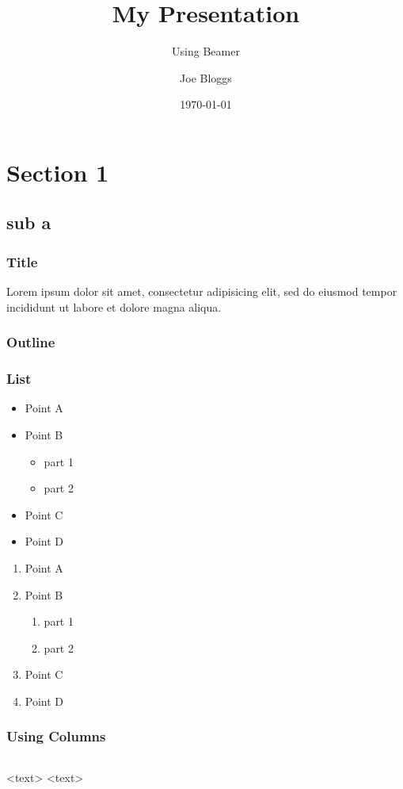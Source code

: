 \documentclass{beamer}
\title{My Presentation}
\subtitle{Using Beamer}
\author{Joe Bloggs}
\institute{University of ShareLaTeX}
\date{\today}
\begin{document}
\begin{frame}
  \titlepage
\end{frame}
\section{Section 1}
\subsection{sub a}

\begin{frame}
\frametitle{Title}
Lorem ipsum dolor sit amet, consectetur adipisicing elit, sed do eiusmod tempor incididunt ut labore et dolore magna aliqua.
\end{frame}
\begin{frame}
  \frametitle{Outline}
  \tableofcontents
\end{frame}

\begin{frame}
  \frametitle{List}
  \begin{itemize}
  \item Point A
  \item Point B
  \begin{itemize}
  \item part 1
  \item part 2
  \end{itemize}
  \item Point C
  \item Point D
  \end{itemize}
\end{frame}

\begin{enumerate}[I]
  \item Point A
  \item Point B
  \begin{enumerate}[i]
  \item part 1
  \item part 2
  \end{enumerate}
  \item Point C
  \item Point D
\end{enumerate}

\begin{frame}
  \frametitle{Using Columns}
  \begin{columns}
  <text>
  <text>
  \end{columns}
\end{frame}
\end{document}

